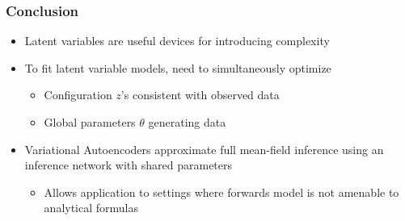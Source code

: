 \documentclass[10pt,mathserif]{beamer}
\begin{document}
\begin{frame}
  \frametitle{Conclusion}
  \begin{itemize}
  \item Latent variables are useful devices for introducing complexity
  \item To fit latent variable models, need to simultaneously optimize
    \begin{itemize}
    \item Configuration $z$'s consistent with observed data
    \item Global parameters $\theta$ generating data
    \end{itemize}
  \item Variational Autoencoders approximate full mean-field inference using an
    inference network with shared parameters
    \begin{itemize}
    \item Allows application to settings where forwards model is not amenable to
      analytical formulas
    \end{itemize}
  \end{itemize}
\end{frame}


\begin{frame}[allowframebreaks]
    
    
\end{frame}
\end{document}
